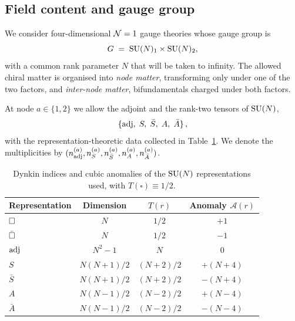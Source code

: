 
\subsection{Field content and gauge group}
\label{sec:setup-content}

We consider four-dimensional $\mathcal{N}=1$ gauge theories whose gauge group is
\begin{equation}
  G\;=\;\mathrm{SU}(N)_{1}\times\mathrm{SU}(N)_{2},
  \label{eq:gauge-group}
\end{equation}
with a common rank parameter $N$ that will be taken to infinity.  The
allowed chiral matter is organised into \emph{node matter}, transforming
only under one of the two factors, and \emph{inter-node matter},
bifundamentals charged under both factors.

At node $a\in\{1,2\}$ we allow the adjoint and the rank-two tensors of
$\mathrm{SU}(N)$,
\begin{equation}
  \{\mathrm{adj},\;S,\;\bar S,\;A,\;\bar A\}\,,
  \label{eq:node-matter}
\end{equation}
with the representation-theoretic data collected in
Table~\ref{tab:SU-reps}.  We denote the multiplicities by
$(n_{\mathrm{adj}}^{(a)},n_{S}^{(a)},n_{\bar S}^{(a)},n_{A}^{(a)},n_{\bar A}^{(a)})$.

\begin{table}[h]
  \centering
  \begin{tabular}{lccc}
    \toprule
    Representation & Dimension & $T(r)$ & Anomaly $\mathcal A(r)$ \\
    \midrule
    $\square$ & $N$            & $1/2$       & $+1$ \\
    $\bar{\square}$& $N$            & $1/2$       & $-1$ \\
    $\mathrm{adj}$  & $N^{2}-1$      & $N$         & $0$  \\
    $S$     & $N(N{+}1)/2$   & $(N{+}2)/2$ & $+(N{+}4)$ \\
    $\bar S$& $N(N{+}1)/2$   & $(N{+}2)/2$ & $-(N{+}4)$ \\
    $A$     & $N(N{-}1)/2$   & $(N{-}2)/2$ & $+(N{-}4)$ \\
    $\bar A$& $N(N{-}1)/2$   & $(N{-}2)/2$ & $-(N{-}4)$ \\
    \bottomrule
  \end{tabular}
  \caption{Dynkin indices and cubic anomalies of the $\mathrm{SU}(N)$
    representations used, with $T(\square)\equiv 1/2$.}
  \label{tab:SU-reps}
\end{table}

